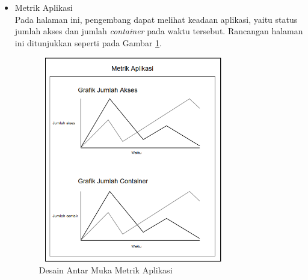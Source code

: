 \begin{itemize}
            \item Metrik Aplikasi \\
            	Pada halaman ini, pengembang dapat melihat keadaan aplikasi, yaitu status jumlah akses dan jumlah \textit{container} pada waktu tersebut. Rancangan halaman ini ditunjukkan seperti pada Gambar \ref{desain:dasbormetrik}.
            \begin{figure}[H]
				\centering
				\includegraphics[width=8.3cm,height=9cm]{Images/C-3/metrik.png}
				\caption{Desain Antar Muka Metrik Aplikasi}
				\label{desain:dasbormetrik}
			\end{figure}
            \end{itemize}